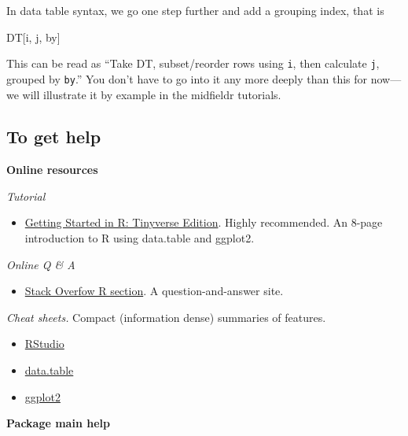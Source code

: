 \documentclass[
]{book}
\newenvironment{Shaded}{\begin{snugshade}}{\end{snugshade}}
\newcommand{\NormalTok}[1]{#1}
\providecommand{\tightlist}{%
  \setlength{\itemsep}{0pt}\setlength{\parskip}{0pt}}
\begin{document}
In data table syntax, we go one step further and add a grouping index, that is

\begin{Shaded}
\begin{Highlighting}[]
\NormalTok{DT[i, j, by]}
\end{Highlighting}
\end{Shaded}

This can be read as ``Take DT, subset/reorder rows using \texttt{i}, then calculate \texttt{j}, grouped by \texttt{by}.'' You don't have to go into it any more deeply than this for now---we will illustrate it by example in the midfieldr tutorials.

\hypertarget{to-get-help}{%
\subsection{To get help}\label{to-get-help}}

\textbf{Online resources}

\emph{Tutorial}

\begin{itemize}
\tightlist
\item
  \href{https://eddelbuettel.github.io/gsir-te/Getting-Started-in-R.pdf}{Getting Started in R: Tinyverse Edition}. Highly recommended. An 8-page introduction to R using data.table and ggplot2.
\end{itemize}

\emph{Online Q \& A}

\begin{itemize}
\tightlist
\item
  \href{https://stackoverflow.com/questions/tagged/r}{Stack Overfow R section}. A question-and-answer site.
\end{itemize}

\emph{Cheat sheets.} Compact (information dense) summaries of features.

\begin{itemize}
\tightlist
\item
  \href{https://github.com/rstudio/cheatsheets/raw/master/rstudio-ide.pdf}{RStudio}
\item
  \href{https://raw.githubusercontent.com/rstudio/cheatsheets/master/datatable.pdf}{data.table}
\item
  \href{https://github.com/rstudio/cheatsheets/raw/master/data-visualization-2.1.pdf}{ggplot2}
\end{itemize}

\textbf{Package main help}
\end{document}

